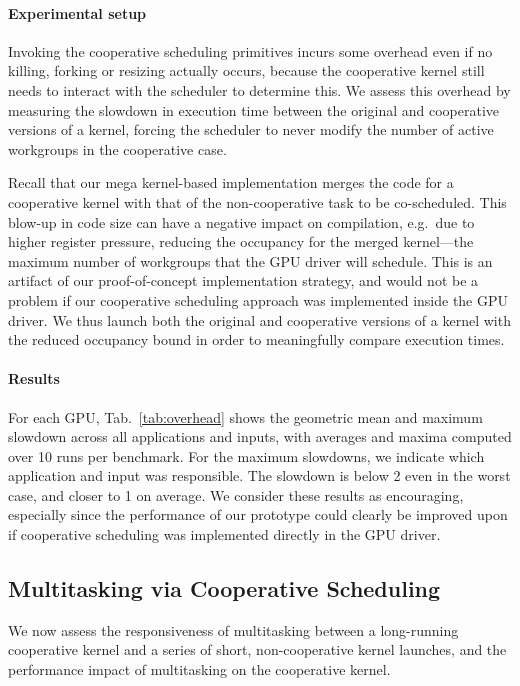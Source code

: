 \documentclass[numbers,nocopyrightspace,10pt]{sigplanconf}
\newcommand{\mytab}{Tab.~}
\begin{document}
\paragraph{Experimental setup}
Invoking the cooperative scheduling primitives incurs some overhead
even if no killing, forking or resizing actually occurs, because the cooperative kernel still needs to interact with the scheduler to determine this.
We assess this overhead by measuring the
 slowdown in execution time between the original and cooperative versions of a kernel, forcing the scheduler to never modify the number of
active workgroups in the cooperative case.

Recall that our mega kernel-based implementation merges the code for a
cooperative kernel with that of the non-cooperative task to be
co-scheduled.  This blow-up in code size can have a negative impact on
compilation, e.g.\ due to higher register pressure, reducing the
occupancy for the merged kernel---the maximum number of workgroups
that the GPU driver will schedule.  This is an artifact of our
proof-of-concept implementation strategy, and would not be a problem
if our cooperative scheduling approach was implemented inside the GPU
driver.  We thus launch both the original and cooperative versions of
a kernel with the reduced occupancy bound in order to meaningfully
compare execution times.

\paragraph{Results}
For each GPU, \mytab\ref{tab:overhead} shows the geometric mean and
maximum slowdown across all applications and inputs, with averages and
maxima computed over 10 runs per benchmark. For the maximum slowdowns,
we indicate which application and input was responsible. The slowdown is
below 2 even in the worst case, and closer to 1 on average. We consider
these results as encouraging, especially since the performance of our
prototype could clearly be improved upon if cooperative scheduling was
implemented directly in the GPU driver.

\subsection{Multitasking via Cooperative Scheduling}\label{sec:responsiveness}

We now assess the responsiveness of multitasking between a long-running cooperative kernel and a series of
short, non-cooperative kernel launches, and the performance impact of multitasking on the cooperative kernel.
\end{document}

